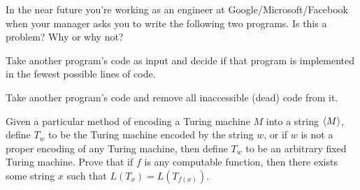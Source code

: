 \documentclass[ps, letterpaper]{cs121}
\begin{document}

\vspace{-6pt}

In the near future you're working as an engineer at Google/Microsoft/Facebook when your manager asks you to write the following two programs. Is this a problem? Why or why not?

\subproblem Take another program's code as input and decide if that program is implemented in the fewest possible lines of code.

\subproblem Take another program's code and remove all inaccessible (dead) code from it.



Given a particular method of encoding a Turing machine $M$ into a string $\langle M\rangle$, define $T_w$ to be the Turing machine encoded by the string $w$, or if $w$ is not a proper encoding of any Turing machine, then define $T_w$ to be an arbitrary fixed Turing machine. \iffalse That is, $$ T_w = \begin{cases} M & \text{ if $w = \<M\>$ for some TM $M$ } \\ 
         \text{The TM that always accepts} & \text{ otherwise} \end{cases} $$\fi
Prove that if $f$ is any computable function, then there exists some string $x$ such that $L(T_x) = L(T_{f(x)})$.

\end{document}
